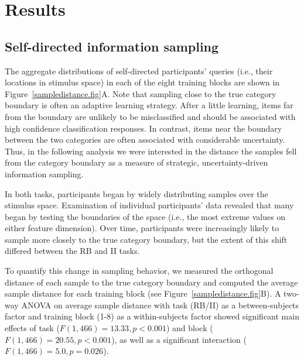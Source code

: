 \documentclass[3p,twocolumn,authoryear,10pt]{elsarticle}
\begin{document}




\section{Results} 


\subsection{Self-directed information sampling}
The aggregate distributions of self-directed participants' queries (i.e., their locations in stimulus space) in each of the eight training blocks are shown in Figure~\ref{sampledistance.fig}A.  
Note that sampling close to the true category boundary is often an adaptive learning strategy.  After a little learning, items far from the boundary
are unlikely to be misclassified and should be associated with high confidence classification responses.  In contrast, items near the boundary between
the two categories are often associated with considerable uncertainty.  Thus, in the following analysis we were interested in the distance the samples fell from the category boundary as a measure of strategic, uncertainty-driven information sampling.

In both tasks, participants began by widely distributing samples over the stimulus space. Examination of individual participants' data revealed that many began by testing the boundaries of the space (i.e., the most extreme values on either feature dimension). Over time, participants were increasingly likely to sample more closely to the true category boundary, but the extent of this shift differed between the RB and II tasks. 


 To quantify this change in sampling behavior, we measured the orthogonal distance of each sample to the true category boundary and computed the average sample distance for each training block (see Figure~\ref{sampledistance.fig}B). A two-way ANOVA on average sample distance with task (RB/II) as a between-subjects factor and training block (1-8) as a within-subjects factor showed significant main effects of task ($F(1,466)=13.33, p<0.001$) and block ($F(1,466)=20.55, p<0.001$), as well as a significant interaction ($F(1,466)=5.0, p=0.026$). 
\end{document}
